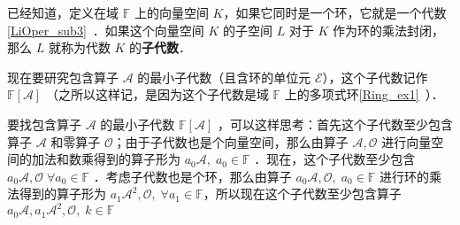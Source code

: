 
已经知道，定义在域 $\mathbb{F}$ 上的向量空间 $K$，如果它同时是一个环，它就是一个代数\autoref{LiOper_sub3}~．如果这个向量空间 $K$ 的子空间 $L$ 对于 $K$ 作为环的乘法封闭，那么 $L$ 就称为代数 $K$ 的\textbf{子代数}．

现在要研究包含算子 $\mathcal{A}$ 的最小子代数（且含环的单位元 $\mathcal{E}$），这个子代数记作 $\mathbb{F}[\mathcal A]$ （之所以这样记，是因为这个子代数是域 $\mathbb{F}$ 上的多项式环\autoref{Ring_ex1}~）．

要找包含算子 $\mathcal{A}$ 的最小子代数 $\mathbb{F}[\mathcal A]$ ，可以这样思考：首先这个子代数至少包含算子 $\mathcal{A}$ 和零算子 $\mathcal{O}$；由于子代数也是个向量空间，那么由算子 $\mathcal{A,O}$ 进行向量空间的加法和数乘得到的算子形为 $a_0\mathcal{A},\;a_0\in\mathbb{F}$ ．现在，这个子代数至少包含 $a_0\mathcal{A,O}\;\forall a_0\in\mathbb{F}$ ．考虑子代数也是个环，那么由算子 $a_0\mathcal{A,O},\;a_0\in\mathbb{F}$ 进行环的乘法得到的算子形为 $a_1\mathcal{A}^2,\mathcal{O},\;\forall a_1\in\mathbb{F}$，所以现在这个子代数至少包含算子 $a_0\mathcal{A},a_1\mathcal{A}^2,\mathcal{O},\;k\in\mathbb{F}$ 